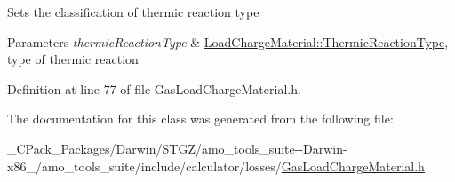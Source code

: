 Sets the classification of thermic reaction type 
\begin{DoxyParams}{Parameters}
{\em thermic\+Reaction\+Type} & \hyperlink{namespace_load_charge_material_a51d4263e865a5d86236622dd3fe23fd1}{Load\+Charge\+Material\+::\+Thermic\+Reaction\+Type}, type of thermic reaction \\
\hline
\end{DoxyParams}


Definition at line 77 of file Gas\+Load\+Charge\+Material.\+h.



The documentation for this class was generated from the following file\+:\begin{DoxyCompactItemize}
\item 
\+\_\+\+C\+Pack\+\_\+\+Packages/\+Darwin/\+S\+T\+G\+Z/amo\+\_\+tools\+\_\+suite-\/-\/\+Darwin-\/x86\+\_/amo\+\_\+tools\+\_\+suite/include/calculator/losses/\hyperlink{___c_pack___packages_2_darwin_2_s_t_g_z_2amo__tools__suite--_darwin-x86__64_2amo__tools__suite_26a031588b5d802b3ba6009030a7c132e}{Gas\+Load\+Charge\+Material.\+h}\end{DoxyCompactItemize}
